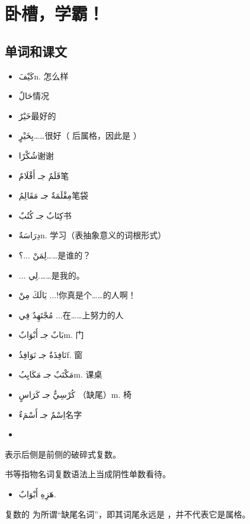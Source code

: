 \chapter{卧槽，学霸！}

\section{ 单词和课文}

\begin{multicols}{2}
    \begin{itemize}
    \item \ac{كَيْفَ}{n. 怎么样}
    \item \ac{حَالٌ}{情况}
    \item \ac{خَيْرٌ}{最好的}
    \item \ac{بِخَيْرٍ}{……很好（ 后属格，因此是 ）}
    \item \ac{شُكْرًا}{谢谢}
    \item \ac{قَلَمٌ جـ أَقْلَامٌ}{笔}
    \item \ac{مِقْلَمَةٌ جـ مَقَالِمُ}{笔袋}
    \item \ac{كِتَابٌ جـ كُتُبٌ}{书}
    \item \ac{دِرَاسَةٌ}{n. 学习（表抽象意义的词根形式）}
    \item \ac{لِمَنْ ...؟}{……是谁的？}
    \item \ac{... لِي.}{……是我的。}
    \item \ac{يَالَكَ مِنْ ...!}{你真是个……的人啊！\\}
    \item \ac{مُجْتَهِدٌ فِي ...}{在……上努力的人}
    \item \ac{بَابٌ جـ أَبْوَابٌ}{m. 门}
    \item \ac{نَافِذَةٌ جـ نَوَافِذُ}{f. 窗}
    \item \ac{مَكْتَبٌ جـ مَكَايِبُ}{m. 课桌}
    \item \ac{كُرْسِيٌّ جـ كَرَاسٍ }{（缺尾）m. 椅}
    \item \ac{اِسْمٌ جـ أَسْمَءٌ}{名字}
    \item []
\end{itemize}
\end{multicols}


\begin{attention}
     表示后侧是前侧的破碎式复数。

    书等指物名词复数语法上当成阴性单数看待。

    \begin{Arabic}
        \begin{itemize}
            \item هَزِهِ أَبْوَابٌ.
        \end{itemize}
    \end{Arabic}

    复数的  为所谓``缺尾名词''，即其词尾永远是 ，并不代表它是属格。
\end{attention}

